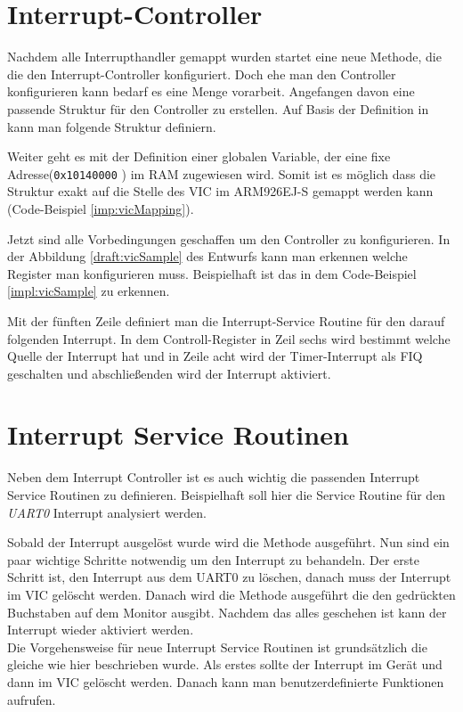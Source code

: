 \section{Interrupt-Controller}
Nachdem alle Interrupthandler gemappt wurden startet eine neue Methode, die die den Interrupt-Controller konfiguriert. Doch ehe man den Controller konfigurieren kann bedarf es eine Menge vorarbeit. Angefangen davon eine passende Struktur f\"ur den Controller zu erstellen. Auf Basis der Definition in \cite[35]{vic} kann man folgende Struktur definiern.

Weiter geht es mit der Definition einer globalen Variable, der eine fixe Adresse(\texttt{0x10140000} \parencite[vgl. Tabelle 4-37][223]{archManI}) im RAM zugewiesen wird. Somit ist es m\"oglich dass die Struktur exakt auf die Stelle des VIC im ARM926EJ-S gemappt werden kann (Code-Beispiel \ref{imp:vicMapping}). 

Jetzt sind alle Vorbedingungen geschaffen um den Controller zu konfigurieren. In der Abbildung \ref{draft:vicSample} des Entwurfs kann man erkennen welche Register man konfigurieren muss. Beispielhaft ist das in dem Code-Beispiel  \ref{impl:vicSample} zu erkennen.

Mit der f\"unften Zeile definiert man die Interrupt-Service Routine f\"ur den darauf folgenden Interrupt. In dem Controll-Register in Zeil sechs wird bestimmt welche Quelle der Interrupt hat und in Zeile acht wird der Timer-Interrupt als FIQ geschalten und abschlie\ss enden wird der Interrupt aktiviert.
\section{Interrupt Service Routinen}
Neben dem Interrupt Controller ist es auch wichtig die passenden Interrupt Service Routinen zu definieren. Beispielhaft soll hier die Service Routine f\"ur den \textit{UART0} Interrupt analysiert werden. 

Sobald der Interrupt ausgel\"ost wurde wird die Methode ausgef\"uhrt. Nun sind ein paar wichtige Schritte notwendig um den Interrupt zu behandeln. Der erste Schritt ist, den Interrupt aus dem UART0 zu l\"oschen, danach muss der Interrupt im VIC gel\"oscht werden. Danach wird die Methode ausgef\"uhrt die den gedr\"uckten Buchstaben auf dem Monitor ausgibt.
Nachdem das alles geschehen ist kann der Interrupt wieder aktiviert werden.\\
Die Vorgehensweise f\"ur neue Interrupt Service Routinen ist grunds\"atzlich die gleiche wie hier beschrieben wurde. Als erstes sollte der Interrupt im Ger\"at und dann im VIC gel\"oscht werden. Danach kann man benutzerdefinierte Funktionen aufrufen.
